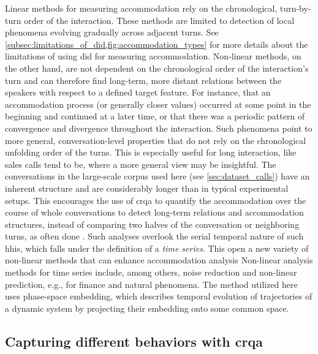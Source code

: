 Linear methods for measuring accommodation rely on the chronological, turn-by-turn order of the interaction.
These methods are limited to detection of local phenomena evolving gradually across adjacent turns.
See \cref{subsec:limitations_of_did,fig:accommodation_types} for more details about the limitations of using \ac{did} for measuring accommodation.
Non-linear methods, on the other hand, are not dependent on the chronological order of the interaction's turn and can therefore find long-term, more distant relations between the speakers with respect to a defined target feature.
For instance, that an accommodation process (or generally closer values) occurred at some point in the beginning and continued at a later time, or that there was a periodic pattern of convergence and divergence throughout the interaction.
Such phenomena point to more general, conversation-level properties that do not rely on the chronological unfolding order of the turns.
This is especially useful for long interaction, like sales calls tend to be, where a more general view may be insightful.
The conversations in the large-scale corpus used here (see \cref{sec:dataset_calls}) have an inherent structure and are considerably longer than in typical experimental setups.
This encourages the use of \ac{crqa} to quantify the accommodation over the course of whole conversations to detect long-term relations and accommodation structures, instead of comparing two halves of the conversation or neighboring turns, as often done \citep{Levitan2013entrainment,Rahimi2018weighting}.
Such analyses overlook the serial temporal nature of such \acp{hhi}, which falls under the definition of a \emph{time series}.
This open a new variety of non-linear methods that can enhance accommodation analysis
Non-linear analysis methods for time series include, among others, noise reduction and non-linear prediction, e.g., for finance and natural phenomena.
The method utilized here uses phase-space embedding, which describes temporal evolution of trajectories of a dynamic system by projecting their embedding onto some common space.

\subsection{Capturing different behaviors with \acs{crqa}}
\label{subsec:capturing_behaviors}

